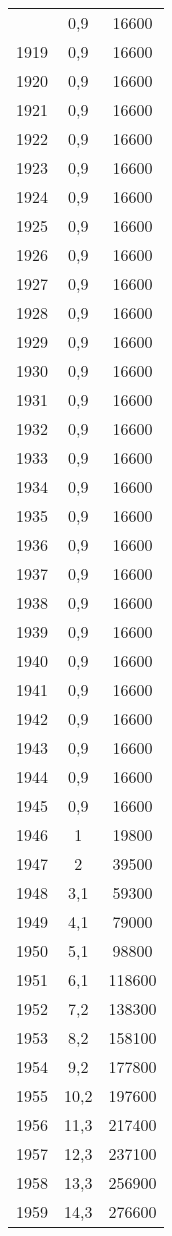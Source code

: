 \documentclass[french,11pt]{book}
\begin{document}
\begin{longtable}[t]{ccc}
\endfoot
\bottomrule
\endlastfoot
1918 & 0,9 & 16600\\
1919 & 0,9 & 16600\\
1920 & 0,9 & 16600\\
1921 & 0,9 & 16600\\
1922 & 0,9 & 16600\\
1923 & 0,9 & 16600\\
1924 & 0,9 & 16600\\
1925 & 0,9 & 16600\\
1926 & 0,9 & 16600\\
1927 & 0,9 & 16600\\
1928 & 0,9 & 16600\\
1929 & 0,9 & 16600\\
1930 & 0,9 & 16600\\
1931 & 0,9 & 16600\\
1932 & 0,9 & 16600\\
1933 & 0,9 & 16600\\
1934 & 0,9 & 16600\\
1935 & 0,9 & 16600\\
1936 & 0,9 & 16600\\
1937 & 0,9 & 16600\\
1938 & 0,9 & 16600\\
1939 & 0,9 & 16600\\
1940 & 0,9 & 16600\\
1941 & 0,9 & 16600\\
1942 & 0,9 & 16600\\
1943 & 0,9 & 16600\\
1944 & 0,9 & 16600\\
1945 & 0,9 & 16600\\
1946 & 1 & 19800\\
1947 & 2 & 39500\\
1948 & 3,1 & 59300\\
1949 & 4,1 & 79000\\
1950 & 5,1 & 98800\\
1951 & 6,1 & 118600\\
1952 & 7,2 & 138300\\
1953 & 8,2 & 158100\\
1954 & 9,2 & 177800\\
1955 & 10,2 & 197600\\
1956 & 11,3 & 217400\\
1957 & 12,3 & 237100\\
1958 & 13,3 & 256900\\
1959 & 14,3 & 276600\\

\end{longtable}
\end{document}
